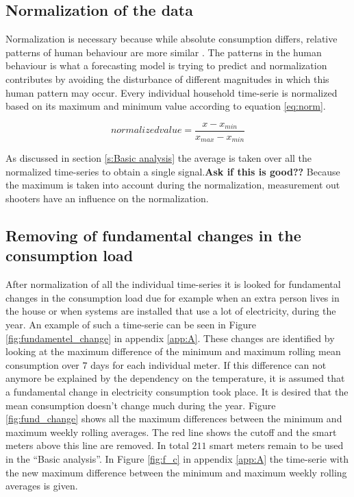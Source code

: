 \subsection{Normalization of the data}
Normalization is necessary because while absolute consumption differs, relative patterns of human behaviour are more similar \cite{Lago2020}. The patterns in the human behaviour is what a forecasting model is trying to predict and normalization contributes by avoiding the disturbance of different magnitudes in which this human pattern may occur. Every individual household time-serie is normalized based on its maximum and minimum value according to equation \ref{eq:norm}. 

\begin{equation}\label{eq:norm}
	normalized value = \frac{x - x_{min}}{x_{max} - x_{min}}
\end{equation}  

As discussed in section \ref{s:Basic analysis} the average is taken over all the normalized time-series to obtain a single signal.\textbf{Ask if this is good??}  Because the maximum is taken into account during the normalization, measurement out shooters have an influence on the normalization. 


\subsection{Removing of fundamental changes in the consumption load}  
After normalization of all the individual time-series it is looked for fundamental changes in the consumption load due for example when an extra person lives in the house or when systems are installed that use a lot of electricity, during the year. An example of such a time-serie can be seen in Figure \ref{fig:fundamentel_change} in appendix \ref{app:A}.
These changes are identified by looking at the maximum difference of the minimum and maximum rolling mean consumption over $ 7 $ days for each individual meter. If this difference can not anymore be explained by the dependency on the temperature, it is assumed that a fundamental change in electricity consumption took place. It is desired that the mean consumption doesn't change much during the year. Figure \ref{fig:fund_change} shows all the maximum differences between the minimum and maximum weekly rolling averages. The red line shows the cutoff and the smart meters above this line are removed. In total $ 211 $ smart meters remain to be used in the ``Basic analysis''. In Figure \ref{fig:f_c} in appendix \ref{app:A} the time-serie with the new maximum difference between the minimum and maximum weekly rolling averages is given.

